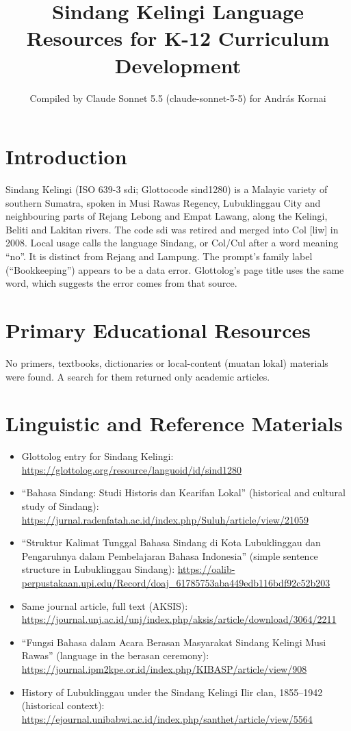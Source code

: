 \documentclass[12pt]{article}
\title{Sindang Kelingi Language Resources for K-12 Curriculum Development}
\author{Compiled by Claude Sonnet 5.5 (claude-sonnet-5-5) for Andr\'as Kornai}
\date{}
\begin{document}
\maketitle

\section{Introduction}
Sindang Kelingi (ISO 639-3 sdi; Glottocode sind1280) is a Malayic variety of southern Sumatra, spoken in Musi Rawas Regency, Lubuklinggau City and neighbouring parts of Rejang Lebong and Empat Lawang, along the Kelingi, Beliti and Lakitan rivers. The code sdi was retired and merged into Col [liw] in 2008. Local usage calls the language Sindang, or Col/Cul after a word meaning ``no''. It is distinct from Rejang and Lampung. The prompt's family label (``Bookkeeping'') appears to be a data error. Glottolog's page title uses the same word, which suggests the error comes from that source.

\section{Primary Educational Resources}
No primers, textbooks, dictionaries or local-content (muatan lokal) materials were found. A search for them returned only academic articles.

\section{Linguistic and Reference Materials}
\begin{itemize}
\item Glottolog entry for Sindang Kelingi: \url{https://glottolog.org/resource/languoid/id/sind1280}
\item ``Bahasa Sindang: Studi Historis dan Kearifan Lokal'' (historical and cultural study of Sindang): \url{https://jurnal.radenfatah.ac.id/index.php/Suluh/article/view/21059}
\item ``Struktur Kalimat Tunggal Bahasa Sindang di Kota Lubuklinggau dan Pengaruhnya dalam Pembelajaran Bahasa Indonesia'' (simple sentence structure in Lubuklinggau Sindang): \url{https://oalib-perpustakaan.upi.edu/Record/doaj_61785753aba449edb116bdf92c52b203}
\item Same journal article, full text (AKSIS): \url{https://journal.unj.ac.id/unj/index.php/aksis/article/download/3064/2211}
\item ``Fungsi Bahasa dalam Acara Berasan Masyarakat Sindang Kelingi Musi Rawas'' (language in the berasan ceremony): \url{https://journal.ipm2kpe.or.id/index.php/KIBASP/article/view/908}
\item History of Lubuklinggau under the Sindang Kelingi Ilir clan, 1855--1942 (historical context): \url{https://ejournal.unibabwi.ac.id/index.php/santhet/article/view/5564}
\end{itemize}
\end{document}
